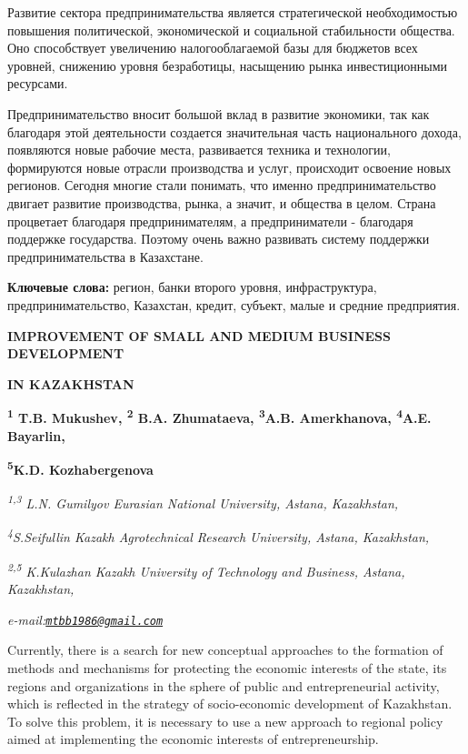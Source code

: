 Развитие сектора предпринимательства является стратегической
необходимостью повышения политической, экономической и социальной
стабильности общества. Оно способствует увеличению налогооблагаемой базы
для бюджетов всех уровней, снижению уровня безработицы, насыщению рынка
инвестиционными ресурсами.

Предпринимательство вносит большой вклад в развитие экономики, так как
благодаря этой деятельности создается значительная часть национального
дохода, появляются новые рабочие места, развивается техника и
технологии, формируются новые отрасли производства и услуг, происходит
освоение новых регионов. Сегодня многие стали понимать, что именно
предпринимательство двигает развитие производства, рынка, а значит, и
общества в целом. Страна процветает благодаря предпринимателям, а
предприниматели - благодаря поддержке государства. Поэтому очень важно
развивать систему поддержки предпринимательства в Казахстане.

{\bfseries Ключевые слова:} регион, банки второго уровня, инфраструктура,
предпринимательство, Казахстан, кредит, субъект, малые и средние
предприятия.

{\bfseries IMPROVEMENT OF SMALL AND MEDIUM BUSINESS DEVELOPMENT}

{\bfseries IN KAZAKHSTAN}

{\bfseries \textsuperscript{1} T.B. Mukushev\textsuperscript{\envelope },
\textsuperscript{2} B.A. Zhumataeva, \textsuperscript{3}A.B.
Amerkhanova, \textsuperscript{4}A.E. Bayarlin,}

{\bfseries \textsuperscript{5}K.D. Kozhabergenova}

\emph{\textsuperscript{1,3} L.N. Gumilyov Eurasian National University,
Astana, Kazakhstan,}

\emph{\textsuperscript{4}S.Seifullin Kazakh Agrotechnical Research
University, Astana, Kazakhstan,}

\emph{\textsuperscript{2,5} K.Kulazhan Kazakh University of Technology
and Business, Astana, Kazakhstan,}

\emph{e-mail:\href{mailto:mtbb1986@gmail.com}{\nolinkurl{mtbb1986@gmail.com}}}

Currently, there is a search for new conceptual approaches to the
formation of methods and mechanisms for protecting the economic
interests of the state, its regions and organizations in the sphere of
public and entrepreneurial activity, which is reflected in the strategy
of socio-economic development of Kazakhstan. To solve this problem, it
is necessary to use a new approach to regional policy aimed at
implementing the economic interests of entrepreneurship.

